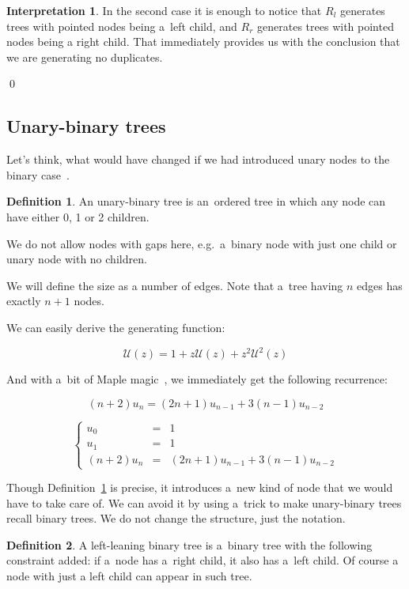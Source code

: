 \documentclass[final]{article}
\theoremstyle{definition}
\newtheorem{definition}{Definition}[subsection]
\theoremstyle{definition}
\newtheorem{interpretation}{Interpretation}[subsection]
\theoremstyle{remark}
\newcommand{\gf}[1]{\ensuremath{\mathcal{#1}}}
\begin{document}
\begin{interpretation}
In the second case it is enough to notice that \(R_l\) generates trees with pointed nodes being a~left child, and \(R_r\) generates trees with pointed nodes being a right child. That immediately provides us with the conclusion that we are generating no duplicates.

\qed%
\end{interpretation}

\subsection{Unary-binary trees}%
\label{sub:unary_binary_trees}

Let's think, what would have changed if we had introduced unary nodes to the binary case~\cite{motzkin}.

\begin{definition}%
    \label{def:unary_binary_tree}
    An unary-binary tree is an~ordered tree in which any node can have either 0, 1 or 2 children.
\end{definition}

We do not allow nodes with gaps here, e.g.~a~binary node with just one child or unary node with no children.

We will define the size as a number of edges. Note that a~tree having \(n\) edges has exactly \(n + 1\) nodes.

We can easily derive the generating function:

\[\gf{U}(z) = 1 + z\gf{U}(z) + z^2 \gf{U}^2(z)\]

And with a~bit of Maple magic~\cite{gfun}, we immediately get the following recurrence:

\[(n + 2)u_{n} = (2n + 1)u_{n - 1} + 3(n - 1)u_{n - 2}\]

\[\left\{\begin{array}{rcl}
            u_0 &=& 1\\
            u_1 &=& 1\\
            (n + 2)u_{n} &=& (2n + 1)u_{n - 1} + 3(n - 1)u_{n - 2}
\end{array}\right.\]

Though Definition~\ref{def:unary_binary_tree} is precise, it introduces a~new kind of node that we would have to take care of. We can avoid it by using a~trick to make unary-binary trees recall binary trees. We do not change the structure, just the notation.

\begin{definition}%
    \label{def:unary_binary_2}
    A left-leaning binary tree is a~binary tree with the following constraint added: if a~node has a~right child, it also has a~left child. Of course a node with just a left child can appear in such tree.
\end{definition}
\end{document}
